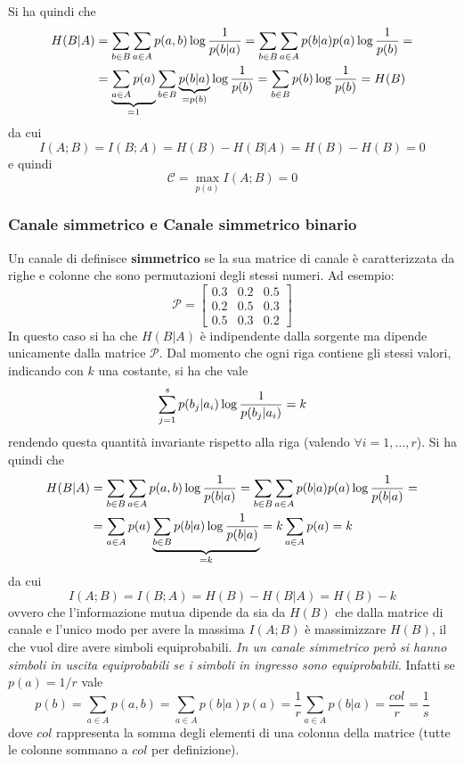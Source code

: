 Si ha quindi che
\begin{align*}
    H(B|A) &= \sum_{b \in B} \sum_{a \in A} p(a,b) \log \frac{1}{p({b|a})} = \sum_{b \in B} \sum_{a \in A} p(b|a) p(a) \log \frac{1}{p({b})} = \\
    &= \underbrace{\sum_{a \in A} p(a)}_{=1} \sum_{b \in B} \underbrace{p(b|a)}_{=p(b)} \log \frac{1}{p({b})} = \sum_{b \in B} p(b) \log \frac{1}{p({b})} = H(B)
\end{align*}
da cui
\begin{equation*}
    I(A;B) = I(B;A) = H(B) - H(B|A) = H(B) - H(B) = 0
\end{equation*}
e quindi
\begin{equation}
    \mathcal{C} = \max_{p(a)} I(A;B) = 0
\end{equation}

\subsubsection{Canale simmetrico e Canale simmetrico binario}
Un canale di definisce \textbf{simmetrico} se la sua matrice di canale è caratterizzata da righe e colonne che sono
permutazioni degli stessi numeri. Ad esempio:
\begin{equation*}
    \mathcal{P} = \begin{bmatrix}
    0.3 & 0.2 & 0.5 \\
    0.2 & 0.5 & 0.3 \\
    0.5 & 0.3 & 0.2    
    \end{bmatrix}
\end{equation*}
In questo caso si ha che $H(B|A)$ \`e indipendente dalla sorgente ma dipende unicamente dalla matrice $\mathcal{P}$. Dal momento che ogni riga contiene gli stessi valori, indicando con $k$ una costante, si ha che vale
\begin{equation}
    \sum_{j=1}^s p(b_j|a_i) \log \frac{1}{p({b_j|a_i})} = k
\end{equation}
rendendo questa quantit\`a invariante rispetto alla riga (valendo $\forall i = 1, \dots, r$). Si ha quindi che
\begin{align*}
    H(B|A) &= \sum_{b \in B} \sum_{a \in A} p(a,b) \log \frac{1}{p({b|a})} = \sum_{b \in B} \sum_{a \in A} p(b|a)p(a) \log \frac{1}{p({b|a})} = \\
    &= \sum_{a \in A} p(a) \underbrace{\sum_{b \in B} p(b|a) \log \frac{1}{p({b|a})}}_{=k} = k \sum_{a \in A} p(a) = k
\end{align*}
da cui
\begin{equation*}
    I(A;B) = I(B;A) = H(B) - H(B|A) = H(B) - k
\end{equation*}
ovvero che l’informazione mutua dipende da sia da $H(B)$ che dalla matrice di canale e l’unico modo per avere la massima $I(A;B)$ è massimizzare $H(B)$, il che vuol dire avere simboli equiprobabili. \textit{In un canale simmetrico per\`o si hanno simboli in uscita equiprobabili se i simboli in ingresso sono equiprobabili}. Infatti se $p(a) = 1/r$ vale 
\begin{equation}
    p(b) = \sum_{a \in A} p(a,b) = \sum_{a \in A} p(b|a)p(a) = \frac{1}{r} \sum_{a \in A} p(b|a) = \frac{col}{r} = \frac{1}{s}
\end{equation}
dove $col$ rappresenta la somma degli elementi di una colonna della matrice (tutte le colonne sommano a $col$ per definizione).

